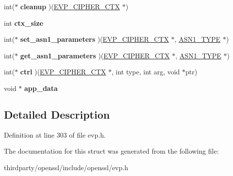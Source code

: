 \begin{DoxyCompactItemize}
int($\ast$ {\bfseries cleanup} )(\hyperlink{structevp__cipher__ctx__st}{E\+V\+P\+\_\+\+C\+I\+P\+H\+E\+R\+\_\+\+C\+TX} $\ast$)
\item 
\mbox{\label{structevp__cipher__st_a856751b3bf79b35b6178f574dea3d1bc}} 
int {\bfseries ctx\+\_\+size}
\item 
\mbox{\label{structevp__cipher__st_aca59cfca681fefba705b0c58f9956e9b}} 
int($\ast$ {\bfseries set\+\_\+asn1\+\_\+parameters} )(\hyperlink{structevp__cipher__ctx__st}{E\+V\+P\+\_\+\+C\+I\+P\+H\+E\+R\+\_\+\+C\+TX} $\ast$, \hyperlink{structasn1__type__st}{A\+S\+N1\+\_\+\+T\+Y\+PE} $\ast$)
\item 
\mbox{\label{structevp__cipher__st_a438856068bda2e643c3e1a713d77ad66}} 
int($\ast$ {\bfseries get\+\_\+asn1\+\_\+parameters} )(\hyperlink{structevp__cipher__ctx__st}{E\+V\+P\+\_\+\+C\+I\+P\+H\+E\+R\+\_\+\+C\+TX} $\ast$, \hyperlink{structasn1__type__st}{A\+S\+N1\+\_\+\+T\+Y\+PE} $\ast$)
\item 
\mbox{\label{structevp__cipher__st_a7f3ad30b0b90b5740b831b9e7aa43cbe}} 
int($\ast$ {\bfseries ctrl} )(\hyperlink{structevp__cipher__ctx__st}{E\+V\+P\+\_\+\+C\+I\+P\+H\+E\+R\+\_\+\+C\+TX} $\ast$, int type, int arg, void $\ast$ptr)
\item 
\mbox{\label{structevp__cipher__st_a11371711dc0f64bacf01b3ad72cf90f3}} 
void $\ast$ {\bfseries app\+\_\+data}
\end{DoxyCompactItemize}


\subsection{Detailed Description}


Definition at line 303 of file evp.\+h.



The documentation for this struct was generated from the following file\+:\begin{DoxyCompactItemize}
\item 
thirdparty/openssl/include/openssl/evp.\+h\end{DoxyCompactItemize}
